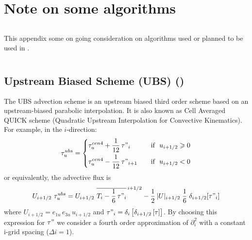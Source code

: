 \documentclass[../tex_main/NEMO_manual]{subfiles}
\begin{document}
\chapter{Note on some algorithms}
\label{apdx:E}
\minitoc

\newpage
$\ $\newline    %

This appendix some on going consideration on algorithms used or planned to be used in \NEMO. 

$\ $\newline    %

\section{Upstream Biased Scheme (UBS) (\protect{})}
\label{sec:TRA_adv_ubs}

The UBS advection scheme is an upstream biased third order scheme based on
an upstream-biased parabolic interpolation.
It is also known as Cell Averaged QUICK scheme (Quadratic Upstream Interpolation for Convective Kinematics).
For example, in the $i$-direction:
\begin{equation} \label{eq:tra_adv_ubs2}
\tau_u^{ubs} = \left\{	 \begin{aligned}
  & \tau_u^{cen4} + \frac{1}{12} \,\tau"_i	   & \quad \text{if }\ u_{i+1/2} \geqslant 0 \\
  & \tau_u^{cen4} - \frac{1}{12} \,\tau"_{i+1} & \quad \text{if }\ u_{i+1/2}       <       0
  						 \end{aligned}    \right.
\end{equation}
or equivalently, the advective flux is
\begin{equation} \label{eq:tra_adv_ubs2}
U_{i+1/2} \ \tau_u^{ubs} 
=U_{i+1/2} \ \overline{ T_i - \frac{1}{6}\,\tau"_i }^{\,i+1/2}
- \frac{1}{2}\, |U|_{i+1/2} \;\frac{1}{6} \;\delta_{i+1/2}[\tau"_i]
\end{equation}
where $U_{i+1/2} = e_{1u}\,e_{3u}\,u_{i+1/2}$ and
$\tau "_i =\delta_i \left[ {\delta_{i+1/2} \left[ \tau \right]} \right]$.
By choosing this expression for $\tau "$ we consider a fourth order approximation of $\partial_i^2$ with
a constant i-grid spacing ($\Delta i=1$).
\end{document}
